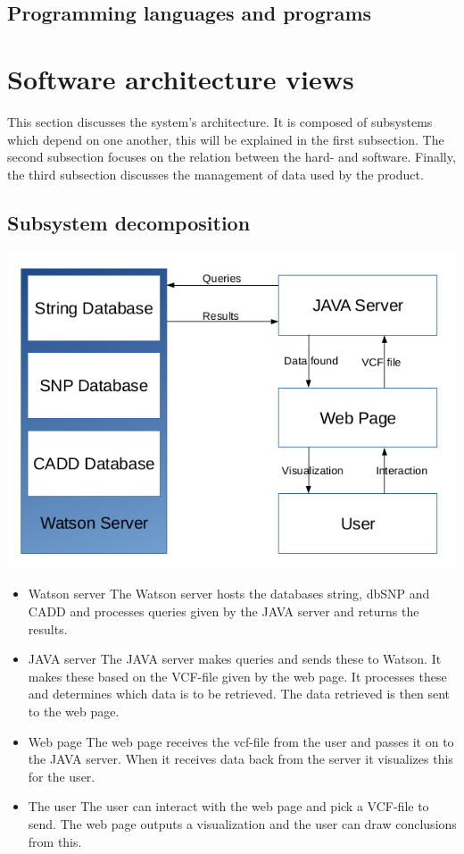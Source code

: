 \documentclass[a4paper]{article}
\begin{document}
		\subsection{Programming languages and programs}
		
	\section{Software architecture views}
		This section discusses the system's architecture. It is composed of subsystems which depend on one another, this will be explained in the first subsection. The second subsection focuses on the relation between the hard- and software. Finally, the third subsection discusses the management of data used by the product.
		\subsection{Subsystem decomposition}
			\includegraphics[scale=0.5]{schema1.png}
			\begin{itemize}
				\item Watson server
					\subitem The Watson server hosts the databases string, dbSNP and CADD and processes queries given by the JAVA server and returns the results.
				\item JAVA server
					\subitem The JAVA server makes queries and sends these to Watson. It makes these based on the VCF-file given by the web page. It processes these and determines which data is to be retrieved. The data retrieved is then sent to the web page.
				\item Web page
					\subitem The web page receives the vcf-file from the user and passes it on to the JAVA server. When it receives data back from the server it visualizes this for the user.
				\item The user 
					\subitem The user can interact with the web page and pick a VCF-file to send. The web page outputs a visualization and the user can draw conclusions from this.
			\end{itemize}
\end{document}
